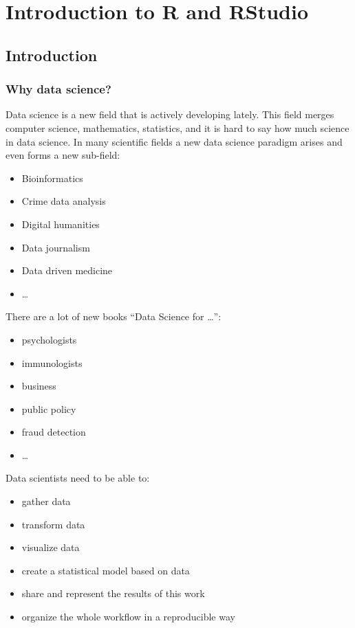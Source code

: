 \documentclass[
]{book}
\providecommand{\tightlist}{%
  \setlength{\itemsep}{0pt}\setlength{\parskip}{0pt}}
\begin{document}
\hypertarget{intro}{%
\chapter{Introduction to R and RStudio}\label{intro}}

\hypertarget{introduction}{%
\section{Introduction}\label{introduction}}

\hypertarget{why-data-science}{%
\subsection{Why data science?}\label{why-data-science}}

Data science is a new field that is actively developing lately. This field merges computer science, mathematics, statistics, and it is hard to say how much science in data science. In many scientific fields a new data science paradigm arises and even forms a new sub-field:

\begin{itemize}
\tightlist
\item
  Bioinformatics
\item
  Crime data analysis
\item
  Digital humanities
\item
  Data journalism
\item
  Data driven medicine
\item
  \ldots{}
\end{itemize}

There are a lot of new books ``Data Science for \ldots{}'':

\begin{itemize}
\tightlist
\item
  psychologists \citep{hansjoerg19}
\item
  immunologists \citep{thomas19}
\item
  business \citep{provost13}
\item
  public policy \citep{brooks13}
\item
  fraud detection \citep{baesens15}
\item
  \ldots{}
\end{itemize}

Data scientists need to be able to:

\begin{itemize}
\tightlist
\item
  gather data
\item
  transform data
\item
  visualize data
\item
  create a statistical model based on data
\item
  share and represent the results of this work
\item
  organize the whole workflow in a reproducible way
\end{itemize}
\end{document}
